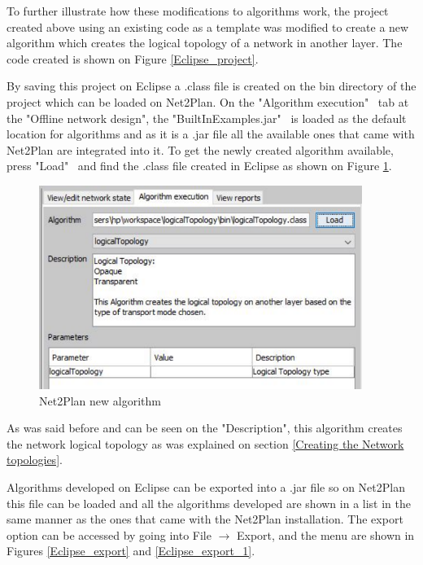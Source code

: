 	To further illustrate how these modifications to algorithms work, the project created above using an existing code as a template was modified to create a new algorithm which creates the logical topology of a network in another layer. The code created is shown on Figure \ref{Eclipse_project}.

By saving this project on Eclipse a .class file is created on the bin directory of the project which can be loaded on Net2Plan. On the "Algorithm execution" \ tab at the "Offline network design", the "BuiltInExamples.jar" \ is loaded as the default location for algorithms and as it is a .jar file all the available ones that came with Net2Plan are integrated into it.	To get the newly created algorithm available, press "Load" \ and find the .class file created in Eclipse as shown on Figure \ref{Net2Plan_introduce_algorithm}.
	
	\begin{figure}[h!]
		\centering
		\includegraphics[width = 10.5cm]{Net2Plan_introduce_algorithm.pdf}
		\caption{Net2Plan new algorithm}
		\label{Net2Plan_introduce_algorithm}
	\end{figure}
			
				
			
	As was said before and can be seen on the "Description", this algorithm creates the network logical topology as was explained on section \ref{Creating the Network topologies}.
			
	Algorithms developed on Eclipse can be exported into a .jar file so on Net2Plan this file can be loaded and all the algorithms developed are shown in a list in the same manner as the ones that came with the Net2Plan installation. The export option can be accessed by going into File $\rightarrow$ Export, and the menu are shown in Figures \ref{Eclipse_export} and \ref{Eclipse_export_1}.
	
